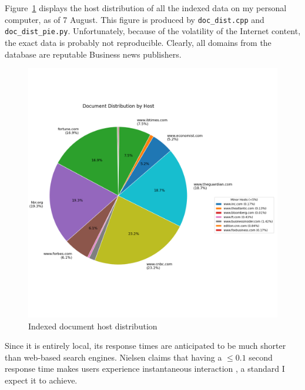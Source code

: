 \documentclass[final-report]{report-template}
\newcommand\ttb{\discretionary{}{}{}}
\begin{document}
Figure~\ref{fig.index.host.dist} displays the host distribution of all the
indexed data on my personal computer, as of 7 August. This figure is produced
by \texttt{doc\_\ttb dist.cpp} and \texttt{doc\_\ttb dist\_\ttb pie.py}.
Unfortunately, because of the volatility of the Internet content, the exact
data is probably not reproducible. Clearly, all domains from the database
are reputable Business news publishers.
\begin{figure}[hbtp!]
	\centering
	\includegraphics[height=.35\textheight]{res/doc_host_dist.png}
	\caption{Indexed document host distribution}
	\label{fig.index.host.dist}
\end{figure}

Since it is entirely local, its response times are anticipated to be much
shorter than web-based search engines. Nielsen claims that having a $\le 0.1$
second response time makes users experience instantaneous interaction
\cite[Chapter~5]{usability.eng}, a standard I expect it to achieve.
\end{document}
